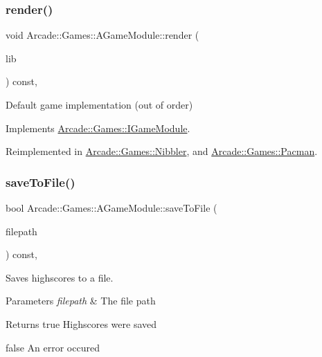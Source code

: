 \subsubsection{\texorpdfstring{render()}{render()}}
{\footnotesize\ttfamily void Arcade\+::\+Games\+::\+A\+Game\+Module\+::render (\begin{DoxyParamCaption}\item[{\mbox{\hyperlink{classArcade_1_1Display_1_1IDisplayModule}{Arcade\+::\+Display\+::\+I\+Display\+Module}} \&}]{lib }\end{DoxyParamCaption}) const\hspace{0.3cm}{\ttfamily [override]}, {\ttfamily [virtual]}}

Default game implementation (out of order) 

Implements \mbox{\hyperlink{classArcade_1_1Games_1_1IGameModule_afd5ec66681e77038e3d4dc17f43e1ee9}{Arcade\+::\+Games\+::\+I\+Game\+Module}}.



Reimplemented in \mbox{\hyperlink{classArcade_1_1Games_1_1Nibbler_afd52ee2fad66523b58f94f9eb582145e}{Arcade\+::\+Games\+::\+Nibbler}}, and \mbox{\hyperlink{classArcade_1_1Games_1_1Pacman_ab1a7408f265efbef12b4f9d1a6fb4512}{Arcade\+::\+Games\+::\+Pacman}}.

\mbox{\label{classArcade_1_1Games_1_1AGameModule_a16425d9ca7518acbc60fbece4a974009}} 
\subsubsection{\texorpdfstring{saveToFile()}{saveToFile()}\hspace{0.1cm}{\footnotesize\ttfamily [1/2]}}
{\footnotesize\ttfamily bool Arcade\+::\+Games\+::\+A\+Game\+Module\+::save\+To\+File (\begin{DoxyParamCaption}\item[{const std\+::string \&}]{filepath }\end{DoxyParamCaption}) const\hspace{0.3cm}{\ttfamily [final]}, {\ttfamily [virtual]}}



Saves highscores to a file. 


\begin{DoxyParams}{Parameters}
{\em filepath} & The file path \\
\hline
\end{DoxyParams}
\begin{DoxyReturn}{Returns}
true Highscores were saved 

false An error occured 
\end{DoxyReturn}


